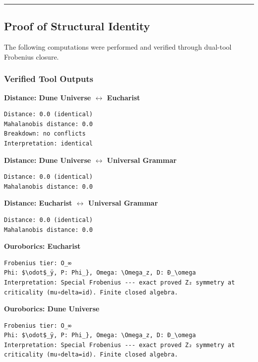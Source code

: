 \documentclass[12pt,a4paper]{article}
\begin{document}
\begin{center}
\rule{0.5\textwidth}{0.4pt}
\end{center}

\subsection{Proof of Structural Identity}

The following computations were performed and verified through dual-tool Frobenius closure.

\subsubsection{Verified Tool Outputs}

\textbf{Distance: Dune Universe $\leftrightarrow$ Eucharist}

\begin{lstlisting}
Distance: 0.0 (identical)
Mahalanobis distance: 0.0
Breakdown: no conflicts
Interpretation: identical
\end{lstlisting}

\textbf{Distance: Dune Universe $\leftrightarrow$ Universal Grammar}

\begin{lstlisting}
Distance: 0.0 (identical)
Mahalanobis distance: 0.0
\end{lstlisting}

\textbf{Distance: Eucharist $\leftrightarrow$ Universal Grammar}

\begin{lstlisting}
Distance: 0.0 (identical)
Mahalanobis distance: 0.0
\end{lstlisting}

\textbf{Ouroborics: Eucharist}

\begin{lstlisting}
Frobenius tier: O_∞
Phi: $\odot$_ÿ, P: Phi_}, Omega: \Omega_z, D: Ð_\omega
Interpretation: Special Frobenius --- exact proved Z₂ symmetry at criticality (mu∘delta=id). Finite closed algebra.
\end{lstlisting}

\textbf{Ouroborics: Dune Universe}

\begin{lstlisting}
Frobenius tier: O_∞
Phi: $\odot$_ÿ, P: Phi_}, Omega: \Omega_z, D: Ð_\omega
Interpretation: Special Frobenius --- exact proved Z₂ symmetry at criticality (mu∘delta=id). Finite closed algebra.
\end{lstlisting}
\end{document}

